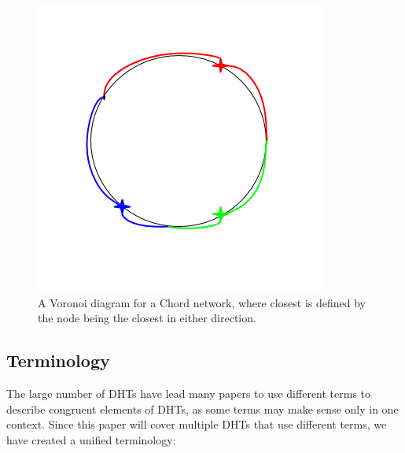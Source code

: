 \begin{figure}
	\centering
	\includegraphics[width=0.5\linewidth]{figs/voro-chord-alternative}
	\caption{A Voronoi diagram for a Chord network, where closest is defined by the node being the closest in either direction.}
	\label{fig:voro-chord-alternative}
\end{figure}

 
\subsection{Terminology}
The large number of DHTs have lead many papers to use different terms to describe congruent elements of DHTs, as some terms may make sense only in one context.
Since this paper will cover multiple DHTs that use different terms, we have created a unified terminology:


